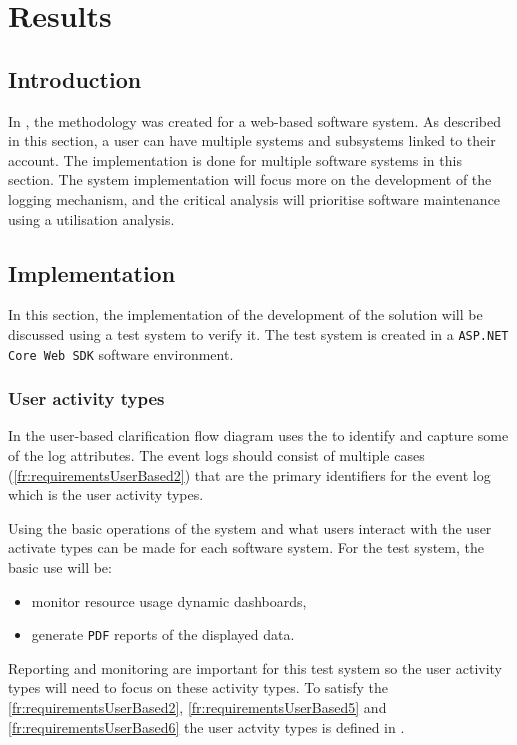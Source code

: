 \chapter{Results}
\label{chap:3}

\section{Introduction}
In , the methodology was created for a web-based software system. As described in this section, a user can have multiple systems and subsystems linked to their account. The implementation is done for multiple software systems in this section. The system implementation will focus more on the development of the logging mechanism, and the critical analysis will prioritise software maintenance using a utilisation analysis.

\section{Implementation}\label{sec:ch3_implementation}
In this section, the implementation of the development of the solution will be discussed using a test system to verify it. The test system is created in a \texttt{ASP.NET Core Web SDK} software environment.

\subsection{User activity types}
In  the user-based clarification flow diagram uses the  to identify and capture some of the log attributes. The event logs should consist of multiple cases (\ref{fr:requirementsUserBased2}) that are the primary identifiers for the event log which is the user activity types.\par Using the basic operations of the system and what users interact with the user activate types can be made for each software system. For the test system, the basic use will be:

\begin{itemize}
	\item monitor resource usage dynamic dashboards,
	\item generate \texttt{PDF} reports of the displayed data.
\end{itemize}

Reporting and monitoring are important for this test system so the user activity types will need to focus on these activity types. To satisfy the \ref{fr:requirementsUserBased2}, \ref{fr:requirementsUserBased5} and \ref{fr:requirementsUserBased6} the user actvity types is defined in .

